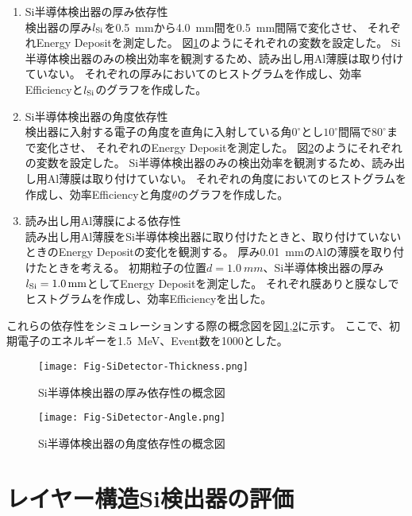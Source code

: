 \documentclass[a4paper,10pt]{jreport}
\begin{document}
\begin{enumerate}
	\item Si半導体検出器の厚み依存性 \\
	検出器の厚み$l_{\rm{Si}}$を\SI{0.5}{mm}から\SI{4.0}{mm}間を\SI{0.5}{mm}間隔で変化させ、
	それぞれEnergy Depositを測定した。
	図\ref{Fig-SiDetector-Thickness}のようにそれぞれの変数を設定した。
	Si半導体検出器のみの検出効率を観測するため、読み出し用Al薄膜は取り付けていない。
	それぞれの厚みにおいてのヒストグラムを作成し、効率Efficiencyと$l_{\rm{Si}}$のグラフを作成した。
	
	\item Si半導体検出器の角度依存性 \\
	検出器に入射する電子の角度を直角に入射している角$0^{\circ}$とし$10^{\circ}$間隔で$80^{\circ}$まで変化させ、
	それぞれのEnergy Depositを測定した。
	 図\ref{Fig-SiDetector-Angle}のようにそれぞれの変数を設定した。
	 Si半導体検出器のみの検出効率を観測するため、読み出し用Al薄膜は取り付けていない。
	それぞれの角度においてのヒストグラムを作成し、効率Efficiencyと角度$\theta$のグラフを作成した。
	
	\item 読み出し用Al薄膜による依存性 \\
	読み出し用Al薄膜をSi半導体検出器に取り付けたときと、取り付けていないときのEnergy Depositの変化を観測する。
	厚み\SI{0.01}{mm}のAlの薄膜を取り付けたときを考える。
	初期粒子の位置$d=\SI{1.0}{mm}$、Si半導体検出器の厚み$l_{\rm{Si}}=\SI{1.0}{mm}$としてEnergy Depositを測定した。
	それぞれ膜ありと膜なしでヒストグラムを作成し、効率Efficiencyを出した。
\end{enumerate}

これらの依存性をシミュレーションする際の概念図を図\ref{Fig-SiDetector-Thickness},\ref{Fig-SiDetector-Angle}に示す。
ここで、初期電子のエネルギーを\SI{1.5}{MeV}、Event数を1000とした。

\begin{figure}[H]
	\center
	\texttt{[image: Fig-SiDetector-Thickness.png]}
	\caption{Si半導体検出器の厚み依存性の概念図} \label{Fig-SiDetector-Thickness}
\end{figure}

\begin{figure}[H]
	\center
	\texttt{[image: Fig-SiDetector-Angle.png]}
	\caption{Si半導体検出器の角度依存性の概念図} \label{Fig-SiDetector-Angle}
\end{figure}



\section{レイヤー構造Si検出器の評価}
\end{document}
